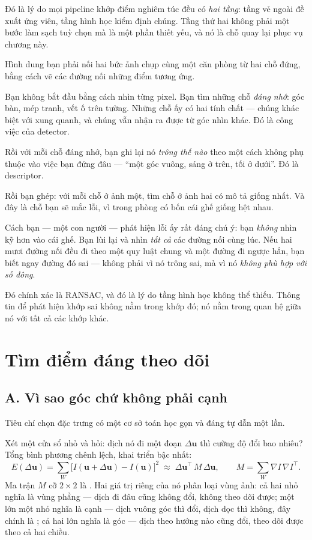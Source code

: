 \documentclass[../../vslam.tex]{subfiles}
\begin{document}
Đó là lý do mọi pipeline khớp điểm nghiêm túc đều có \emph{hai tầng}: tầng vẻ ngoài đề xuất ứng viên, tầng hình học kiểm định chúng. Tầng thứ hai không phải một bước làm sạch tuỳ chọn mà là một phần thiết yếu, và nó là chỗ  quay lại phục vụ chương này.

\begin{trucgiac}
Hình dung bạn phải nối hai bức ảnh chụp cùng một căn phòng từ hai chỗ đứng, bằng cách vẽ các đường nối những điểm tương ứng.

Bạn không bắt đầu bằng cách nhìn từng pixel. Bạn tìm những chỗ \emph{đáng nhớ}: góc bàn, mép tranh, vết ố trên tường. Những chỗ ấy có hai tính chất --- chúng khác biệt với xung quanh, và chúng vẫn nhận ra được từ góc nhìn khác. Đó là công việc của detector.

Rồi với mỗi chỗ đáng nhớ, bạn ghi lại nó \emph{trông thế nào} theo một cách không phụ thuộc vào việc bạn đứng đâu --- ``một góc vuông, sáng ở trên, tối ở dưới''. Đó là descriptor.

Rồi bạn ghép: với mỗi chỗ ở ảnh một, tìm chỗ ở ảnh hai có mô tả giống nhất. Và đây là chỗ bạn sẽ mắc lỗi, vì trong phòng có bốn cái ghế giống hệt nhau.

Cách bạn --- một con người --- phát hiện lỗi ấy rất đáng chú ý: bạn \emph{không} nhìn kỹ hơn vào cái ghế. Bạn lùi lại và nhìn \emph{tất cả} các đường nối cùng lúc. Nếu hai mươi đường nối đều đi theo một quy luật chung và một đường đi ngược hẳn, bạn biết ngay đường đó sai --- không phải vì nó trông sai, mà vì nó \emph{không phù hợp với số đông}.

Đó chính xác là RANSAC, và đó là lý do tầng hình học không thể thiếu. Thông tin để phát hiện khớp sai không nằm trong khớp đó; nó nằm trong quan hệ giữa nó với tất cả các khớp khác.
\end{trucgiac}

\section{Tìm điểm đáng theo dõi}

\subsection{A. Vì sao góc chứ không phải cạnh}

Tiêu chí chọn đặc trưng có một cơ sở toán học gọn và đáng tự dẫn một lần.

Xét một cửa sổ nhỏ và hỏi: dịch nó đi một đoạn \(\Delta\mathbf{u}\) thì cường độ đổi bao nhiêu? Tổng bình phương chênh lệch, khai triển bậc nhất:
\[
E(\Delta\mathbf{u}) = \sum_W \bigl[I(\mathbf{u}+\Delta\mathbf{u}) - I(\mathbf{u})\bigr]^2
\;\approx\; \Delta\mathbf{u}^{\top}\,M\,\Delta\mathbf{u},
\qquad
M = \sum_W \nabla I\,\nabla I^{\top}.
\]
Ma trận \(M\) cỡ \(2\times2\) là . Hai giá trị riêng của nó phân loại vùng ảnh: cả hai nhỏ nghĩa là vùng phẳng --- dịch đi đâu cũng không đổi, không theo dõi được; một lớn một nhỏ nghĩa là cạnh --- dịch vuông góc thì đổi, dịch dọc thì không, đây chính là ; cả hai lớn nghĩa là góc --- dịch theo hướng nào cũng đổi, theo dõi được theo cả hai chiều.
\end{document}
